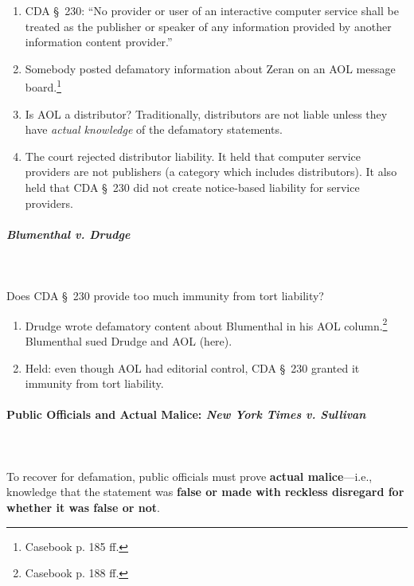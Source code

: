\begin{enumerate}
    \item CDA \S\ 230: ``No provider or user of an interactive computer service 
    shall be treated as the publisher or speaker of any information provided by 
    another information content provider.''
    \item Somebody posted defamatory information about Zeran on an AOL message 
    board.\footnote{Casebook p. 185 ff.}
    \item Is AOL a distributor? Traditionally, distributors are not liable 
    unless they have \emph{actual knowledge} of the defamatory statements.
    \item The court rejected distributor liability. It held that computer 
    service providers are not publishers (a category which includes 
    distributors). It also held that CDA \S\ 230 did not create notice-based 
    liability for service providers.
\end{enumerate}

\paragraph{\emph{Blumenthal v. Drudge}}
~\\\\
Does CDA \S\ 230 provide too much immunity from tort liability?

\begin{enumerate}
    \item Drudge wrote defamatory content about Blumenthal in his AOL 
    column.\footnote{Casebook p. 188 ff.} Blumenthal sued Drudge and AOL (here).
    \item Held: even though AOL had editorial control, CDA \S\ 230 granted it 
    immunity from tort liability.
\end{enumerate}

\paragraph{Public Officials and Actual Malice: \emph{New York Times v.  
Sullivan}}
~\\\\
To recover for defamation, public officials must prove \textbf{actual 
malice}---i.e., knowledge that the statement was \textbf{false or made with 
reckless disregard for whether it was false or not}.

